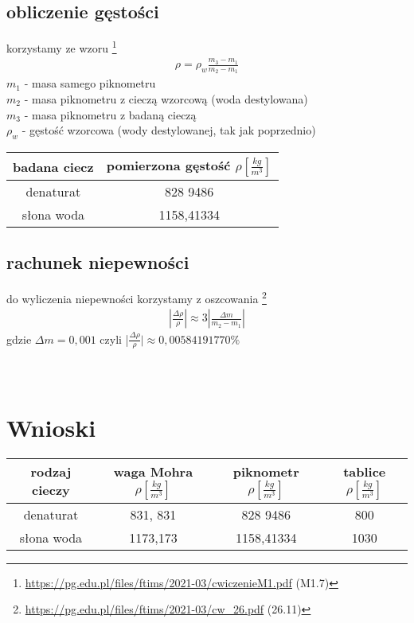 \documentclass{article}
\begin{document}
\subsection{obliczenie gęstości}

korzystamy ze wzoru \footnote{\url{https://pg.edu.pl/files/ftims/2021-03/cwiczenieM1.pdf} (M1.7)} 
\begin{gather*}
	\rho = \rho_w \frac{m_3 - m_1}{m_2 - m_1}
\end{gather*}
$m_1$ - masa samego piknometru \\
$m_2$ - masa piknometru z cieczą wzorcową (woda destylowana) \\
$m_3$ - masa piknometru z badaną cieczą \\
$\rho_w$ - gęstość wzorcowa (wody destylowanej, tak jak poprzednio)

\begin{center}
\begin{tabular}{ c | c }
badana ciecz & pomierzona gęstość $\rho [\frac{kg}{m^3}]$\\
\hline
 denaturat  & 828 9486 \\  
 słona woda & 1158,41334
\end{tabular}
\end{center}
\subsection{rachunek niepewności}
do wyliczenia niepewności korzystamy z oszcowania \footnote{\url{https://pg.edu.pl/files/ftims/2021-03/cw_26.pdf} (26.11)} \\
\begin{gather*}
	|\frac{\Delta\rho}{\rho}| \approx 3|\frac{\Delta m}{m_2 - m_1}|
\end{gather*}
gdzie $\Delta m = 0,001$
czyli |$\frac{\Delta\rho}{\rho}|  \approx 0,00584191770\%$
\\ \\ \\
\section{Wnioski}

\begin{center}
\begin{tabular}{ c | c | c | c }
rodzaj cieczy & waga Mohra  $\rho [\frac{kg}{m^3}]$ & piknometr $\rho [\frac{kg}{m^3}]$ & tablice $\rho [\frac{kg}{m^3}] $ \\

\hline
 denaturat  & 831, 831 &  828 9486 & 800\\  
 słona woda & 1173,173 &1158,41334 & 1030
\end{tabular}
\end{center}
\end{document}

